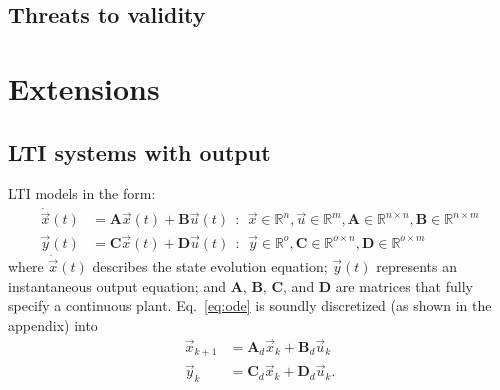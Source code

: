 \documentclass[runningheads,a4paper]{llncs}
\newcommand{\mat}[1]{\boldsymbol{#1}}
\begin{document}
\subsection{Threats to validity}




\section{Extensions}
\label{sec:extensions}

\subsection{LTI systems with output} 
\label{ssec:LTI}

LTI models in the form: 
%
\begin{align}
\label{eq:ode}
\dot{\vec{x}}(t)&=\mat{A}\vec{x}(t)+\mat{B}\vec{u}(t)\ \ :\ \ \vec{x} \in \mathbb{R}^{n}, \vec{u} \in \mathbb{R}^m, \mat{A} \in \mathbb{R}^{n \times n},\mat{B} \in \mathbb{R}^{n \times m}\\
\vec{y}(t)&=\mat{C}\vec{x}(t)+\mat{D}\vec{u}(t)\ \ :\ \ \vec{y} \in \mathbb{R}^{o}, \mat{C} \in \mathbb{R}^{o \times n}, \mat{D}  \in \mathbb{R}^{o \times m}\nonumber
\end{align}
\noindent where $\dot{\vec{x}}(t)$ describes the state evolution equation; 
$\vec{y}(t)$ represents an instantaneous output equation; and $\mat{A}$, $\mat{B}$, $\mat{C}$, and $\mat{D}$ are matrices that fully specify 
a continuous plant. Eq.~\eqref{eq:ode} is soundly discretized 
(as shown in the appendix) into
%
\begin{align}
\label{eq:plant}
\vec{x}_{k+1}&=\mat{A}_d\vec{x}_k+\mat{B}_d\vec{u}_k\\
\vec{y}_k&=\mat{C}_d\vec{x}_k+\mat{D}_d\vec{u}_k .\nonumber
\end{align}
%


\newpage


  
\end{document}
